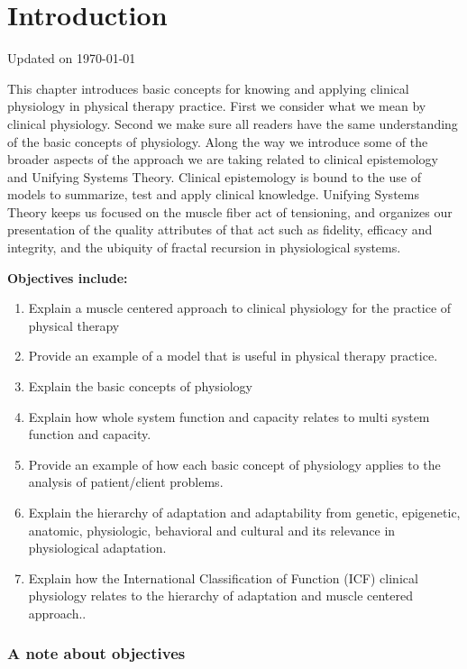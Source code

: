 \chapter{Introduction}
Updated on \today
\minitoc


This chapter introduces basic concepts for knowing and applying clinical physiology in physical therapy practice. First we consider what we mean by clinical physiology. Second we make sure all readers have the same understanding of the basic concepts of physiology. Along the way we introduce some of the broader aspects of the approach we are taking related to clinical epistemology and Unifying Systems Theory. Clinical epistemology is bound to the use of models to summarize, test and apply clinical knowledge. Unifying Systems Theory keeps us focused on the muscle fiber act of tensioning, and organizes our presentation of the quality attributes of that act such as fidelity, efficacy and integrity, and the ubiquity of fractal recursion in physiological systems. 

\vspace{5mm}

\textbf{Objectives include:}
\begin{enumerate}
    \item Explain a muscle centered approach to clinical physiology for the practice of physical therapy
    \item Provide an example of a model that is useful in physical therapy practice.
    \item Explain the basic concepts of physiology
    \item Explain how whole system function and capacity relates to multi system function and capacity. 
    \item Provide an example of how each basic concept of physiology applies to the analysis of patient/client problems.
    \item Explain the hierarchy of adaptation and adaptability from genetic, epigenetic, anatomic, physiologic, behavioral and cultural and its relevance in physiological adaptation.
    \item Explain how the International Classification of Function (ICF) clinical physiology relates to the hierarchy of adaptation and muscle centered approach..
\end{enumerate}

\subsection{A note about objectives}

